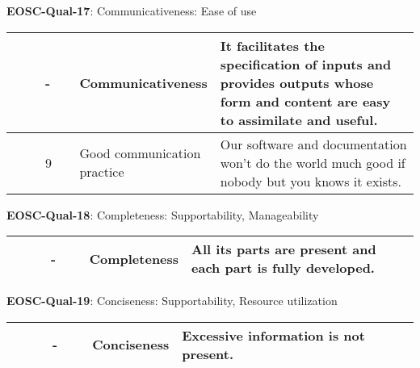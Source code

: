 \textbf{EOSC-Qual-17}: Communicativeness: Ease of use
\nopagebreak[4]
\begin{center}
    \tabletail{\hline}
    \tiny
    \begin{supertabular}{|p{0.10\linewidth}|p{0.10\linewidth}|p{0.20\linewidth}|p{0.60\linewidth}|} \hline
        \cite{boehm_quantitative_1976} & - & Communicativeness & It facilitates the specification of inputs and provides outputs whose form and content are easy to assimilate and useful.\\ \hline
        \cite{raymond_software_2013} & 9 & Good communication practice & Our software and documentation won't do the world much good if nobody but you knows it exists.\\ \hline
    \end{supertabular}
\end{center}

\textbf{EOSC-Qual-18}: Completeness: Supportability, Manageability
\nopagebreak[4]
\begin{center}
    \tabletail{\hline}
    \tiny
    \begin{supertabular}{|p{0.10\linewidth}|p{0.10\linewidth}|p{0.20\linewidth}|p{0.60\linewidth}|} \hline
        \cite{boehm_quantitative_1976} & - & Completeness & All its parts are present and each part is fully developed.\\ \hline
    \end{supertabular}
\end{center}

\textbf{EOSC-Qual-19}: Conciseness: Supportability, Resource utilization
\nopagebreak[4]
\begin{center}
    \tabletail{\hline}
    \tiny
    \begin{supertabular}{|p{0.10\linewidth}|p{0.10\linewidth}|p{0.20\linewidth}|p{0.60\linewidth}|} \hline
        \cite{boehm_quantitative_1976} & - & Conciseness & Excessive information is not present.\\ \hline
    \end{supertabular}
\end{center}

